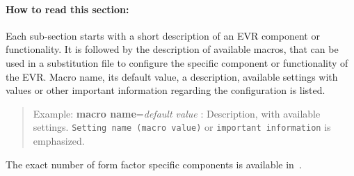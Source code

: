 \documentclass[12pt,a4paper]{article}
\begin{document}


\paragraph{How to read this section:}
Each sub-section starts with a short description of an EVR component or functionality. It is followed by the description of available macros, that can be used in a substitution file to configure the specific component or functionality of the EVR.
Macro name, its default value, a description, available settings with values or other important information regarding the configuration is listed.
\begin{quote}
Example: \textbf{macro name}=\emph{default value} : Description, with available settings. \texttt{Setting name (macro value)} or \texttt{important information} is emphasized.
\end{quote}
The exact number of form factor specific components is available in~\cite{mrm_evr}. 

\end{document}
